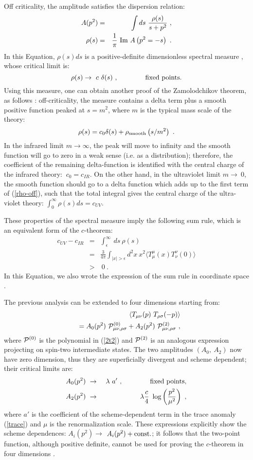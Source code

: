 \documentclass[proceedings]{JHEP}
\newcommand{\beq}{\begin{equation}}
\newcommand{\eeq}{\end{equation}}
\newcommand{\bea}{\begin{eqnarray}}
\newcommand{\eea}{\end{eqnarray}}
\def\s{\sigma}
\def\d{\delta}
\def\eps{\epsilon}
\def\l{\lambda}
\def\r{\rho}
\def\Im{\hbox{\rm Im\ }}
\def\nl{\nonumber\\}
\def\bra{\langle}
\def\ket{\rangle}
\begin{document}
Off criticality, the amplitude satisfies the dispersion relation:
\bea
A(p^2)&=&\int ds\ \frac{\r(s)}{s+p^2}\ ,\nl
\r(s)&=& \frac{1}{\pi}\ \Im A\left( p^2 = -s \right)\ .
\label{disp}\eea
In this Equation, $\r(s) d s$ is a positive-definite
dimensionless spectral measure \cite{cfl}, whose critical limit is:
\beq
\r(s) \to\ c\ \d (s)\ ,\qquad\qquad   {\rm fixed\ points}.
\label{rho-c}\eeq
Using this measure, one can obtain another proof
of the Zamolodchikov theorem, as follows \cite{cfl}:
off-criticality, the measure contains a delta term plus a
smooth positive function peaked at $s=m^2$, where $m$
is the typical mass scale of the theory:
\beq 
\r (s)= c_0 \d (s) + \r_{\rm smooth}\left(s/m^2 \right)\ .
\label{rho-off}\eeq
In the infrared limit $m\to\infty$, the peak 
will move to infinity and the smooth function will go to
zero in a weak sense (i.e. as a distribution);
therefore, the coefficient of the remaining delta-function
is identified with the central charge of the infrared theory:
$\ c_0=c_{IR}$. 
On the other hand, in the ultraviolet limit $m\to\ 0$,
the smooth function should go to a delta function which
adds up to the first term of (\ref{rho-off}), such that the total integral
gives the central charge of the ultra-violet theory: 
$\int_0^\infty \r(s)ds = c_{UV}$.

These properties of the spectral measure imply the
following sum rule, which is an equivalent form of the $c$-theorem:
\bea
c_{UV}-c_{IR} &=& \int_\eps^\infty\ ds\ \r(s) \nl
&=& \frac{3}{4\pi}\int_{|x|>\eps} d^2x\ x^2
\bra T_\mu^\mu(x) T_\nu^\nu (0) \ket \nl
&>& \ 0\ .
\label{s-rule}\eea
In this Equation, we also wrote the
expression of the sum rule in coordinate space \cite{sumrule}.

The previous analysis can be extended to four dimensions 
\cite{cfl}\cite{kaguma} starting from:
\bea
&&\bra T_{\mu\nu}(p)\ T_{\r\s}(-p) \ket \nl
&&= A_0(p^2) \ {\cal P}^{(0)}_{\mu\nu,\r\s}
+ A_2(p^2) \ {\cal P}^{(2)}_{\mu\nu,\r\s}\ ,
\label{2t4}\eea
where ${\cal P}^{(0)}$ is the polynomial in (\ref{2t2})
and ${\cal P}^{(2)}$ is an analogous expression 
projecting on spin-two intermediate states.
The two amplitudes $( A_0 ,\ A_2)$ now have  
zero dimension, thus they are superficially
divergent and scheme dependent; their critical limits are:
\bea
A_0(p^2) &\ \to\ &\l \ a'\ ,\qquad\qquad {\rm fixed\ points},\nl
A_2(p^2) &\ \to\ &\l \frac{c}{4}\ \log 
\left( \frac{p^2}{\mu^2} \right) \ ,
\label{a-crit}\eea
where $a'$ is the coefficient of the scheme-dependent
term in the trace anomaly (\ref{trace}) and
$\mu$ is the renormalization scale.
These expressions explicitly show the scheme dependences:
$A_i(p^2)\to$ $ A_i(p^2) + {\rm const.}$; it follows
that the two-point function, although positive definite, 
cannot be used for proving the $c$-theorem in four dimensions
\cite{cfl}\cite{os}.
\end{document}
